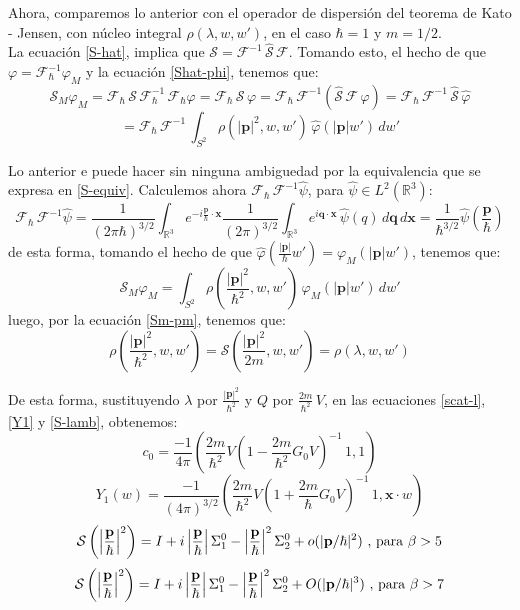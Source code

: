 \documentclass[12pt]{book}
\numberwithin{equation}{chapter}
\def\q{\mathbf{q}}
\def\R{\mathbb{R}}
\def\S{\mathcal{S}}
\def\F{\mathcal{F}}
\def\x{\mathbf{x}}
\def\P{\mathbf{p}}
\begin{document}
Ahora, comparemos lo anterior con el operador de dispersi\'on del teorema de Kato - Jensen, con n\'ucleo integral $\rho( \lambda,w,w' )$, en el caso $\hbar=1$ y $m=1/2$.\\

La ecuaci\'on \eqref{S-hat}, implica que $ \S= \F^{-1} \, \hat{\S} \, \F $. Tomando esto, el hecho de que $\varphi= \F_{\hbar}^{-1} \varphi_{M} $ y la ecuaci\'on \eqref{Shat-phi}, tenemos que:
$$ \S_{M}\varphi_{M}= \F_{\hbar}\, \S \, \F_{\hbar}^{-1}\, \F_{\hbar} \varphi = \F_{\hbar}\, \S \, \varphi =\F_{\hbar} \, \F^{-1}( \hat{\S} \, \F \, \varphi )= \F_{\hbar} \, \F^{-1} \,\hat{\S} \,\hat{\varphi} $$
$$= \F_{\hbar} \, \F^{-1} \, \int_{S^{2}} \rho(|\P|^{2},w,w') \, \hat{\varphi}(|\P|w')\, dw' $$

Lo anterior e puede hacer sin ninguna ambiguedad por la equivalencia que se expresa en \eqref{S-equiv}. Calculemos ahora $\F_{\hbar} \, \F^{-1} \hat{\psi}$, para $\hat{\psi} \in L^{2}(\R^{3})$:
$$ \F_{\hbar} \, \F^{-1} \hat{\psi}= \frac{1}{(2 \pi \hbar)^{3/2}} \int_{\R^{3}} e^{-i\frac{\P}{\hbar}\cdot \x } \frac{1}{(2 \pi)^{3/2}} \int_{\R^{3}} e^{i \q \cdot \x} \, \hat{\psi}(q) \, d\q \, d\x = \frac{1}{\hbar^{3/2}} \hat{\psi} \left( \frac{\P}{\hbar} \right) $$
de esta forma, tomando el hecho de que $\hat{\varphi}\left( \frac{|\P|}{\hbar}w' \right)= \varphi_{M}(|\P|w') $, tenemos que:
$$ \S_{M}\varphi_{M}= \int_{S^{2}} \rho\left(\frac{|\P|^{2}}{\hbar^{2}},w,w' \right) \, \varphi_{M}( |\P|w' )\, dw' $$
luego, por la ecuaci\'on \eqref{Sm-pm}, tenemos que:
$$ \rho\left(\frac{|\P|^{2}}{\hbar^{2}},w,w' \right)= \S \left(\frac{|\P|^{2}}{2m},w,w'  \right)= \rho\left(\lambda,w,w' \right) $$

\newpage

De esta forma, sustituyendo $\lambda$ por $\frac{|\P|^{2}}{\hbar^{2}}$ y $Q$ por $\frac{2m}{\hbar^{2}} \, V $, en las ecuaciones \eqref{scat-l}, \eqref{Y1} y \eqref{S-lamb}, obtenemos:
$$ c_{0}=\frac{-1}{4\pi} \left( \frac{2m}{\hbar^{2}}V \left(1 - \frac{2m}{\hbar^{2}}G_{0} V \right)^{-1}\, 1,1  \right) $$
$$ Y_{1}(w)= \frac{-1}{(4\pi)^{3/2}} \left( \frac{2m}{\hbar^{2}}V \left( 1+\frac{2m}{\hbar} G_{0}V \right)^{-1}\, 1, \x \cdot w  \right) $$
$$ \S \left( \left| \frac{\P}{\hbar} \right|^{2} \right)=I + i \left| \frac{\P}{\hbar} \right| \Sigma_{1}^{0} - \left| \frac{\P}{\hbar} \right|^{2} \Sigma_{2}^{0} + o(|\P/\hbar|^{2}) \,\,,\,\hbox{para } \beta>5 $$
$$ \S \left( \left| \frac{\P}{\hbar} \right|^{2} \right)=I + i \left| \frac{\P}{\hbar} \right| \Sigma_{1}^{0} - \left| \frac{\P}{\hbar} \right|^{2} \Sigma_{2}^{0} + O(|\P/\hbar|^{3}) \,\,,\,\hbox{para } \beta>7 $$
\end{document}

